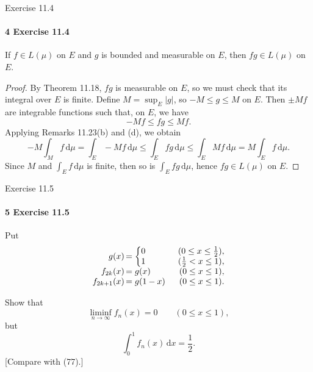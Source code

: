 \documentclass[12pt]{article}
\newenvironment{fullbox}{\begin{lrbox}{\savefullbox}\begin{minipage}{\dimexpr\textwidth-2\fboxsep\relax}}{\end{minipage}\end{lrbox}\begin{center}\framebox[\textwidth]{\usebox{\savefullbox}}\end{center}}
\newenvironment{pbox}[1][]{\begin{fullbox}\ifx#1\empty\else\paragraph{#1}\fi}{\end{fullbox}}
\newcommand{\<}{\langle}
\renewcommand{\>}{\rangle}
\newcommand{\dd}[1]{\,\mathrm{d}#1}
\begin{document}
\newpage
\begin{pbox}[4 Exercise 11.4]
    If $f \in L(\mu)$ on $E$ and $g$ is bounded and measurable on $E$, then $fg \in L(\mu)$ on $E$.
\end{pbox}

\begin{proof}
    By Theorem 11.18, $fg$ is measurable on $E$, so we must check that its integral over $E$ is finite. Define $M = \sup_E |g|$, so $-M \leq g \leq M$ on $E$. Then $\pm Mf$ are integrable functions such that, on $E$, we have
    \[
        -Mf \leq fg \leq Mf.
    \]
    Applying Remarks 11.23(b) and (d), we obtain
    \[
        -M\int_M f \dd{\mu} 
            = \int_E -Mf \dd{\mu} 
            \leq \int_E fg \dd{\mu}
            \leq \int_E Mf \dd{\mu}
            = M\int_E f \dd{\mu}.
    \]
    Since $M$ and $\int_E f \dd{\mu}$ is finite, then so is $\int_E fg \dd{\mu}$, hence $fg \in L(\mu)$ on $E$.

\end{proof}


\newpage
\begin{pbox}[5 Exercise 11.5]
    Put
    \[
        \begin{array}{r@{\,}lr}
            g(x)        &= \left\{\begin{array}{@{}l} 0 \\ 1 \end{array}\right. 
                            & \begin{array}{r@{}} 
                                (0\leq x \leq \frac{1}{2}),\\
                                (\frac{1}{2} < x \leq 1),
                            \end{array} \\
            f_{2k}(x)   &= g(x) &  (0 \leq x \leq 1),\\
            f_{2k+1}(x) &= g(1-x) & \hfill (0 \leq x \leq 1).
        \end{array}
    \]
    
    Show that
    \[\liminf_{n \to \infty} f_n(x) = 0 \qquad (0\leq x\leq 1),\]
    but
    \[\int_0^1 f_n(x) \dd{x} = \frac{1}{2}.\]
    [Compare with (77).]
\end{pbox}
\end{document}
